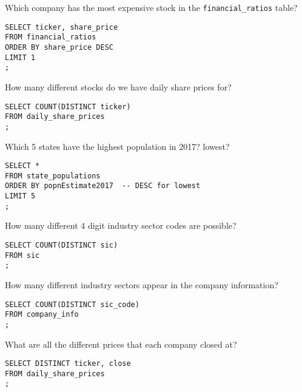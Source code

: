 \documentclass[10pt]{exam}
\begin{document}
\begin{questions}
    \question Which company has the most expensive stock in the
    \texttt{financial\_ratios} table?

\begin{solution}
\begin{lstlisting}
SELECT ticker, share_price
FROM financial_ratios
ORDER BY share_price DESC
LIMIT 1
;
\end{lstlisting}
\end{solution}


\question How many different stocks do we have daily share prices for?

\begin{solution}
\begin{lstlisting}
SELECT COUNT(DISTINCT ticker)
FROM daily_share_prices
;
\end{lstlisting}
\end{solution}


\question Which 5 states have the highest population in 2017? lowest?

\begin{solution}
\begin{lstlisting}
SELECT *
FROM state_populations
ORDER BY popnEstimate2017  -- DESC for lowest
LIMIT 5
;
\end{lstlisting}
\end{solution}


\question How many different 4 digit industry sector codes are possible?

\begin{solution}
\begin{lstlisting}
SELECT COUNT(DISTINCT sic)
FROM sic
;
\end{lstlisting}
\end{solution}


\question How many different industry sectors appear in the company
information?

\begin{solution}
\begin{lstlisting}
SELECT COUNT(DISTINCT sic_code)
FROM company_info
;
\end{lstlisting}
\end{solution}


\question What are all the different prices that each company closed at?

\begin{solution}
\begin{lstlisting}
SELECT DISTINCT ticker, close
FROM daily_share_prices
;
\end{lstlisting}
\end{solution}


\end{questions}
\end{document}
